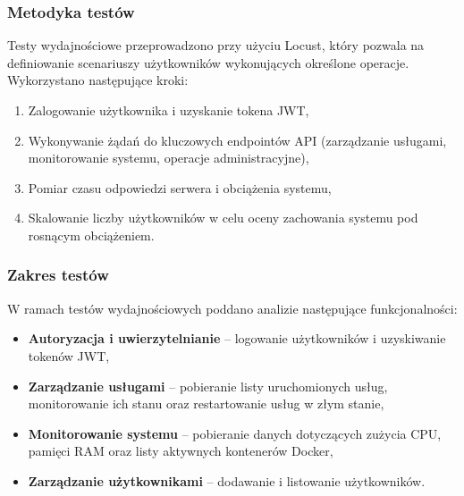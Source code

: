\subsubsection{Metodyka testów}
Testy wydajnościowe przeprowadzono przy użyciu Locust, który pozwala na definiowanie scenariuszy użytkowników wykonujących określone operacje. Wykorzystano następujące kroki:
\begin{enumerate}
    \item Zalogowanie użytkownika i uzyskanie tokena JWT,
    \item Wykonywanie żądań do kluczowych endpointów API (zarządzanie usługami, monitorowanie systemu, operacje administracyjne),
    \item Pomiar czasu odpowiedzi serwera i obciążenia systemu,
    \item Skalowanie liczby użytkowników w celu oceny zachowania systemu pod rosnącym obciążeniem.
\end{enumerate}

\subsubsection{Zakres testów}
W ramach testów wydajnościowych poddano analizie następujące funkcjonalności:
\begin{itemize}
    \item \textbf{Autoryzacja i uwierzytelnianie} – logowanie użytkowników i uzyskiwanie tokenów JWT,
    \item \textbf{Zarządzanie usługami} – pobieranie listy uruchomionych usług, monitorowanie ich stanu oraz restartowanie usług w złym stanie,
    \item \textbf{Monitorowanie systemu} – pobieranie danych dotyczących zużycia CPU, pamięci RAM oraz listy aktywnych kontenerów Docker,
    \item \textbf{Zarządzanie użytkownikami} – dodawanie i listowanie użytkowników.
\end{itemize}

